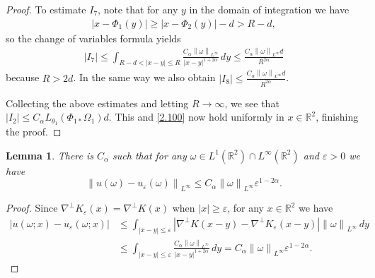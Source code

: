 \documentclass[reqno,centertags,12pt]{amsart}
\newtheorem{lemma}[theorem]{Lemma}
\theoremstyle{definition}
\numberwithin{equation}{section}
\newcommand{\abs}[1]{\left\lvert#1\right\rvert}
\newcommand{\norm}[1]{\left\|#1\right\|}
\newcommand{\bbR}{{\mathbb{R}}}
\newcommand{\eps}{\varepsilon}
\begin{document}
\begin{proof}
    To estimate $I_{7}$, note that for any $y$ in the domain of integration we have
    \begin{align*}
        \abs{x - \Phi_{1}(y)} \geq \abs{x - \Phi_{2}(y)} - d > R - d,
    \end{align*}
    so the change of variables formula yields
    \begin{align*}
        \abs{I_{7}} \leq \int_{R - d < \abs{x - y} \leq R}
        \frac{C_{\alpha}\norm{\omega}_{L^{\infty}}}
        {\abs{x - y}^{1 + 2\alpha}}\,dy
        \leq \frac{ C_{\alpha}\norm{\omega}_{L^{\infty}}d}{R^{2\alpha}}
    \end{align*}
    because ${R} >2d$.
    In the same way we also obtain $|I_{8}|\le \frac{C_{\alpha}\norm{\omega}_{L^{\infty}}d}{R^{2\alpha}}$.
    
    Collecting the above estimates and letting $R\to\infty$, we see that
    $\abs{I_{2}} \leq C_{\alpha}L_{\theta_{1}}(\Phi_{1*}\Omega_{1})d$.
    This and \eqref{2.100} now hold uniformly in $x\in\bbR^{2}$, finishing the proof.
\end{proof}

\begin{lemma}\label{L2.3}
    There is $C_{\alpha}$ such that for any
    $\omega\in L^{1}(\bbR^{2})\cap L^{\infty}(\bbR^{2})$ and $\eps>0$ we have
    \[
        \norm{u(\omega) - u_{\eps}(\omega)}_{L^{\infty}}
        \leq C_{\alpha}\norm{\omega}_{L^{\infty}}\eps^{1-2\alpha}.
    \]
\end{lemma}

\begin{proof}
    Since $\nabla^{\perp}K_{\eps}(x) = \nabla^{\perp}K(x)$
    when $\abs{x}\geq\eps$, for any $x\in\bbR^{2}$ we have
    \begin{align*}
        \abs{u(\omega;x) - u_{\eps}(\omega;x)}
        &\leq \int_{\abs{x - y}\leq \eps}
        \abs{\nabla^{\perp}K(x-y) - \nabla^{\perp}K_{\eps}(x-y)}
        \norm{\omega}_{L^{\infty}}\,dy \\
        &\leq \int_{\abs{x - y}\leq \eps}
        \frac{C_{\alpha}\norm{\omega}_{L^{\infty}}}{\abs{x - y}^{1 + 2\alpha}}\,dy
        = C_{\alpha}\norm{\omega}_{L^{\infty}}\eps^{1-2\alpha}.
    \end{align*}
\end{proof}
\end{document}
